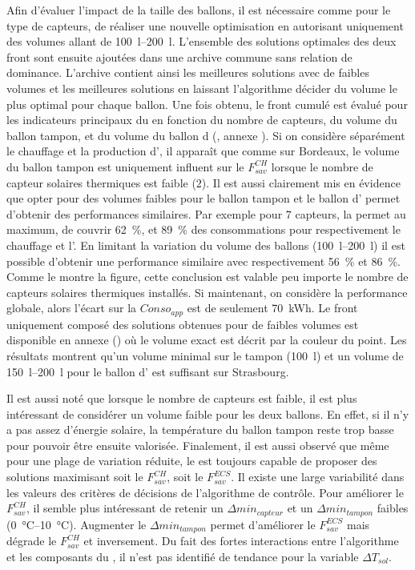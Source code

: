 Afin d’évaluer l’impact de la taille des ballons, il est nécessaire comme pour le type
de capteurs, de réaliser une nouvelle optimisation en autorisant uniquement des volumes allant
de \SIrange{100}{200}{\litre}. L’ensemble des solutions optimales des deux front sont ensuite
ajoutées dans une archive commune sans relation de dominance. L’archive contient ainsi les meilleures
solutions avec de faibles volumes et les meilleures solutions en laissant l’algorithme décider
du volume le plus optimal pour chaque ballon.
Une fois obtenu, le front cumulé est évalué pour les indicateurs principaux du 
en fonction du nombre de capteurs, du volume du ballon tampon, et du volume du ballon d
(, annexe ).
Si on considère séparément le chauffage et la production d’,
il apparaît que comme sur Bordeaux, le volume du ballon tampon est uniquement influent
sur le $F_{sav}^{CH}$ lorsque le nombre de capteur solaires thermiques est faible ($2$).
Il est aussi clairement mis en évidence que opter pour des volumes faibles pour le
ballon tampon et le ballon d’ permet d’obtenir des performances similaires.
Par exemple pour $7$ capteurs, la  permet au maximum, de couvrir
\SI{62}{\percent}, et \SI{89}{\percent} des consommations pour respectivement le chauffage et l’.
En limitant la variation du volume des ballons (\SIrange{100}{200}{\litre}) il est possible d’obtenir
une performance similaire avec respectivement
\SI{56}{\percent} et \SI{86}{\percent}. Comme le montre la figure, cette conclusion est valable
peu importe le nombre de capteurs solaires thermiques installés. Si maintenant, on considère
la performance globale, alors l’écart sur la $Conso_{app}$ est de seulement \SI{70}{kWh}.
Le front uniquement composé des solutions obtenues pour de faibles volumes est disponible
en annexe () où le volume exact est décrit par
la couleur du point. Les résultats montrent qu’un volume minimal sur le tampon (\SI{100}{\litre})
et un volume de \SIrange{150}{200}{\litre} pour le ballon d’ est suffisant sur Strasbourg.

Il est aussi noté que lorsque le nombre de capteurs est faible, il est plus intéressant de
considérer un volume faible pour les deux ballons. En effet, si il n’y a pas assez
d’énergie solaire, la température du ballon tampon reste trop basse pour pouvoir être
ensuite valorisée. Finalement, il est aussi observé que même pour une plage de variation
réduite, le  est toujours capable de proposer des solutions maximisant soit le
$F_{sav}^{CH}$, soit le $F_{sav}^{ECS}$. Il existe une large variabilité dans les valeurs
des critères de décisions de l’algorithme de contrôle. Pour améliorer le $F_{sav}^{CH}$,
il semble plus intéressant de retenir un $\Delta min_{capteur}$ et un $\Delta
min_{tampon}$ faibles (\SIrange{0}{10}{\celsius}). Augmenter le $\Delta min_{tampon}$
permet d’améliorer le $F_{sav}^{ECS}$ mais dégrade le $F_{sav}^{CH}$ et inversement. Du
fait des fortes interactions entre l’algorithme et les composants du , il n’est
pas identifié de tendance pour la variable $\Delta T_{sol}$.


